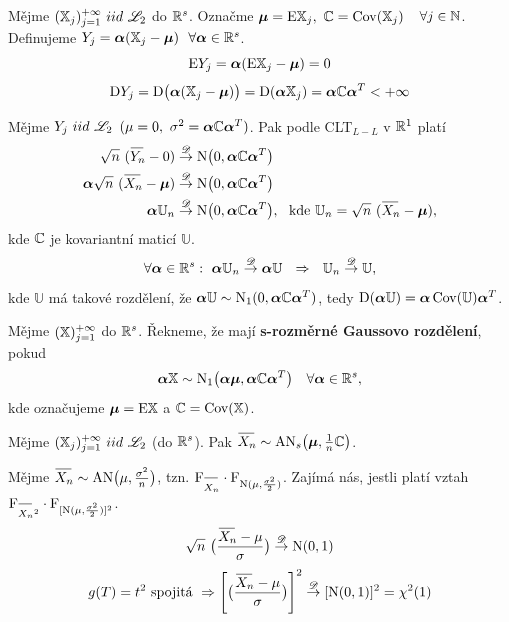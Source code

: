 \begin{theorem}
	Mějme $(\mathbb{X}_j)_{j=1}^{+\infty}~iid~\mathscr{L}_2$ do $\R^s$. Označme $\boldsymbol\mu=\mathrm{E}\mathbb{X}_j,~\mathbb{C}=\mathop{\mathrm{Cov}}(\mathbb{X}_j)$~~$\forall j\in\mathbb{N}$. Definujeme $Y_j=\boldsymbol\alpha(\mathbb{X}_j-\boldsymbol\mu)~~\forall\boldsymbol\alpha\in\mathbb{R}^s$.
	$$ \mathrm{E} Y_j=\boldsymbol\alpha(\mathrm{E}\mathbb{X}_j-\boldsymbol\mu)=0 $$
	$$ \mathrm{D} Y_j = \mathrm{D} \bigl(\boldsymbol\alpha(\mathbb{X}_j-\boldsymbol\mu)\bigr)=\mathrm{D}(\boldsymbol\alpha\mathbb{X}_j)=\boldsymbol\alpha\mathbb{C}\boldsymbol\alpha^T<+\infty $$
	
\end{theorem}
\begin{remark}
	Mějme $Y_j~iid~\mathscr{L}_2$ $(\mu=0,~\sigma^2=\boldsymbol\alpha\mathbb{C}\boldsymbol\alpha^T)$. Pak podle CLT$_{L-L}$ v $\mathbb{R}^1$ platí \[
	\begin{split}
	\sqrt{n}~(\oyn-0)&\Dto \mathrm{N}\br{0,\boldsymbol\alpha\C\boldsymbol\alpha^T}\\
	\boldsymbol\alpha\sqrt{n}~(\oxn-\boldsymbol\mu)&\Dto \mathrm{N}\br{0,\boldsymbol\alpha\C\boldsymbol\alpha^T}\\
	\boldsymbol\alpha\mathbb{U}_n&\Dto \mathrm{N}\br{0,\boldsymbol\alpha\C\boldsymbol\alpha^T},~~\text{kde }\mathbb{U}_n=\sqrt{n}~(\oxn-\boldsymbol\mu),
	\end{split}
	\] kde $\mathbb{C}$ je kovariantní maticí $\mathbb{U}$.
	$$ \forall\boldsymbol{\alpha}\in\mathbb{R}^s:~\boldsymbol{\alpha}\mathbb{U}_n\stackrel{\mathscr{D}}{\to} \boldsymbol{\alpha}\mathbb{U}~~\Rightarrow~~\mathbb{U}_n\stackrel{\mathscr{D}}{\to} \mathbb{U}, $$ kde $\mathbb{U}$ má takové rozdělení, že $\boldsymbol{\alpha}\mathbb{U}\sim \mathrm{N}_1(0,\boldsymbol{\alpha}\mathbb{C}\boldsymbol{\alpha}^T)$, tedy $\mathrm{D}(\boldsymbol{\alpha}\mathbb{U})=\boldsymbol{\alpha}\mathop{\mathrm{Cov}}(\mathbb{U})\boldsymbol{\alpha}^T$.
\end{remark}
\begin{define}
	Mějme $(\mathbb{X})_{j=1}^{+\infty}$ do $\R^s$. Řekneme, že mají \textbf{s-rozměrné Gaussovo rozdělení}, pokud 
	$$ \boldsymbol{\alpha}\mathbb{X}\sim \mathrm{N}_1\bigl(\boldsymbol{\alpha}\boldsymbol{\mu},\boldsymbol{\alpha}\mathbb{C}\boldsymbol{\alpha}^T \bigr)~~~\forall\boldsymbol{\alpha}\in\mathbb{R}^s, $$ kde označujeme $\boldsymbol{\mu}=\mathrm{E}\mathbb{X}$ a $\mathbb{C}=\mathop{\mathrm{Cov}}(\mathbb{X})$.
\end{define}
\begin{theorem}[CLT v $\R^s$]
	Mějme $(\mathbb{X}_j)_{j=1}^{+\infty}~iid~\mathscr{L}_2$ (do $\R^s$). Pak $\oxn\sim \mathrm{AN}_s\br{\boldsymbol{\mu},\frac{1}{n}\C}$.
\end{theorem}
\begin{remark}
	Mějme $\oxn\sim\mathrm{AN}\br{\mu,\frac{\sigma^2}{n}}$, tzn. $\FF_{\oxn}\cdot \FF_{\mathrm{N}(\mu,\frac{\sigma^2}{2})}$. Zajímá nás, jestli platí vztah $\FF_{\oxn^2}\cdot \FF_{[\mathrm{N}(\mu,\frac{\sigma^2}{2})]^2}$.
		$$ \sqrt{n}~\br{\frac{\oxn-\mu}{\sigma}}\Dto \mathrm{N}(0,1) $$
		$$ g(T)=t^2 \text{ spojitá }\Rightarrow \left[ \br{\frac{\oxn-\mu}{\sigma}} \right]^2 \Dto [\mathrm{N}(0,1)]^2=\chi^2(1) $$
\end{remark}
